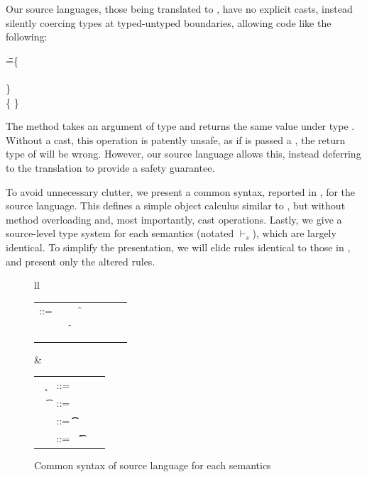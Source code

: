 \documentclass[runnningheads]{tex/llncs}
\begin{document}
Our source languages, those being translated to \kafka, 
have no explicit casts, instead silently coercing
types at typed-untyped boundaries, allowing code like the following:

\begin{tabbing}
\hspace{1cm}\K\HS \Call{\New\C{}}\m{\New\D{}} \HS\HS\HS\WHERE\HS
  \K\HS =\HS \= \class\= \C \{\\
       \> \HS \Mdef\m\x\any\C{\HS\x\HS}\\
       \> \}  \\
       \>\class \D \{ \}
\end{tabbing}         

\noindent The method \m takes an argument of type \any and returns the
same value under type \C. Without a cast, this operation is patently unsafe,
as if \m is passed a \D, the return type of \m will be wrong. However, our
source language allows this, instead deferring  to the translation to  provide
a safety guarantee.

To avoid unnecessary clutter, we present a
common syntax, reported in , for the source language. This defines a simple
object calculus similar to \kafka, but without method overloading and, most
importantly, cast operations. Lastly, we give a source-level type system for 
each semantics (notated $\vdash_{\!s}$), which are largely identical. To 
simplify the presentation, we will elide rules identical to those in \kafka, and present
only the altered rules.

\begin{figure}[!h]\hrulefill
 \small
	
	\begin{tabular}{ll}
		\begin{minipage}{6cm}\begin{tabular}{@{}l@{~}l@{}l@{}l@{}l@{}l@{}l@{}l}
				\e\hspace{.1cm} ::= & \hspace{.2cm} \x        
				&\B \this         
				&\B \FRead\f \\    
				&
				&\B \FWrite\f\e
				&\B \Call\e\m\e \\
				& 
				&\B \that      
				&\B \New\C{\e[1]..}  
		\end{tabular}\end{minipage}&
		\begin{minipage}{5cm}\begin{tabular}{l@{~}l@{}l@{}l}
				~ \k &::= \Class \C {\fd[1]..}{\md[1]..} \\
				~ \t&::= ~ \any  \B   \C  \\ 
				\md &::= \Mdef\m\x\t\t\e \\
				~\fd&::= ~ \Fdef\f\t \\ 
		\end{tabular}\end{minipage} 
	\end{tabular}
	\vspace{2mm} 
	\caption{Common syntax of source language for each semantics}\label{f:sourcesyntax}
\end{figure}
\end{document}
